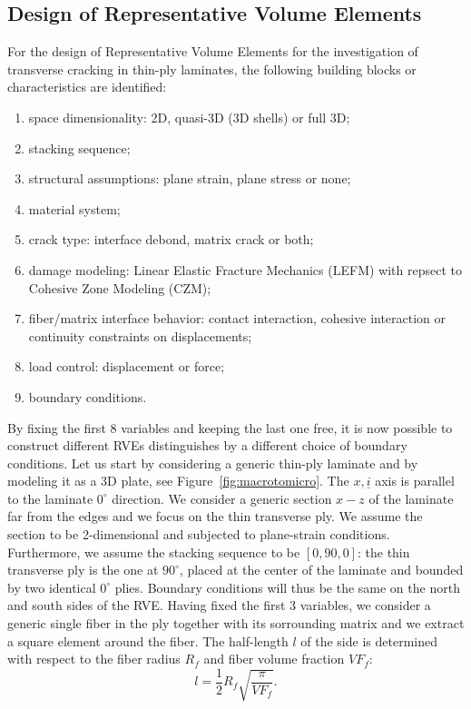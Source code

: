 \documentclass[a4paper]{jpconf}
\begin{document}
\subsection{Design of Representative Volume Elements}
For the design of Representative Volume Elements for the investigation of transverse cracking in thin-ply laminates, the following building blocks or characteristics are identified:
\begin{enumerate}
\item space dimensionality: 2D, quasi-3D (3D shells) or full 3D;
\item stacking sequence;
\item structural assumptions: plane strain, plane stress or none;
\item material system;
\item crack type: interface debond, matrix crack or both;
\item damage modeling: Linear Elastic Fracture Mechanics (LEFM) with repsect to Cohesive Zone Modeling (CZM);
\item fiber/matrix interface behavior: contact interaction, cohesive interaction or continuity constraints on displacements;
\item load control: displacement or force;
\item boundary conditions.
\end{enumerate}
By fixing the first 8 variables and keeping the last one free, it is now possible to construct different RVEs distinguishes by a different choice of boundary conditions. Let us start by considering a generic thin-ply laminate and by modeling it as a 3D plate, see Figure~\ref{fig:macrotomicro}. The $x,\underline{i}$ axis is parallel to the laminate $0^{\circ}$ direction. We consider a generic section $x-z$ of the laminate far from the edges and we focus on the thin transverse ply. We assume the section to be 2-dimensional and subjected to plane-strain conditions. Furthermore, we assume the stacking sequence to be $\left[0,90,0\right]$: the thin transverse ply is the one at $90^{\circ}$, placed at the center of the laminate and bounded by two identical $0^{\circ}$ plies. Boundary conditions will thus be the same on the north and south sides of the RVE. Having fixed the first 3 variables, we consider a generic single fiber in the ply together with its sorrounding matrix and we extract a square element around the fiber. The half-length $l$ of the side is determined with respect to the fiber radius $R_{f}$ and fiber volume fraction $VF_{f}$:
\begin{equation}
l=\frac{1}{2}R_{f}\sqrt{\frac{\pi}{VF_{f}}}.
\end{equation}
\end{document}
